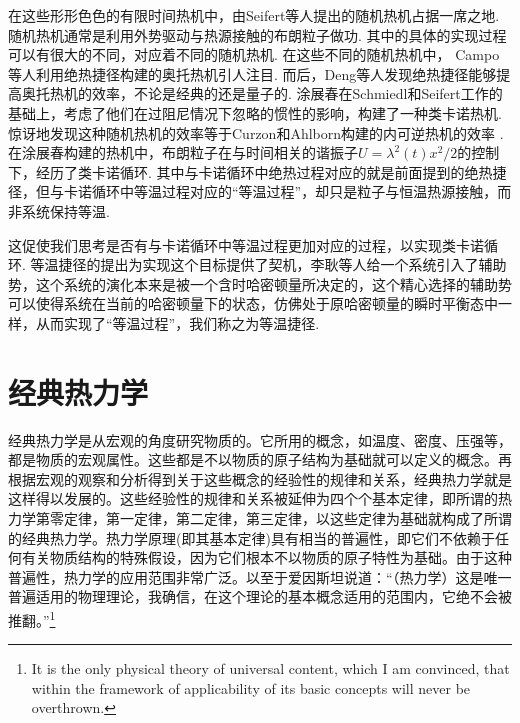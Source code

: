 在这些形形色色的有限时间热机中，由Seifert等人提出的随机热机\cite{Schmiedl2008}占据一席之地. 随机热机通常是利用外势驱动与热源接触的布朗粒子做功. 其中的具体的实现过程可以有很大的不同，对应着不同的随机热机. 在这些不同的随机热机中， Campo等人利用绝热捷径构建的奥托热机\cite{DelCampo2014}引人注目. 而后，Deng等人发现绝热捷径能够提高奥托热机的效率，不论是经典的还是量子的.\cite{Deng2013} 涂展春在Schmiedl和Seifert工作\cite{Schmiedl2008}的基础上，考虑了他们在过阻尼情况下忽略的惯性的影响，构建了一种类卡诺热机\cite{Tu2013}. 惊讶地发现这种随机热机的效率等于Curzon和Ahlborn构建的内可逆热机\cite{Curzon1975}的效率 . 在涂展春构建的热机中\cite{Tu2013}，布朗粒子在与时间相关的谐振子$U=\lambda ^2\left( t \right) x^2/2$的控制下，经历了类卡诺循环. 其中与卡诺循环中绝热过程对应的就是前面提到的绝热捷径，但与卡诺循环中等温过程对应的“等温过程”，却只是粒子与恒温热源接触，而非系统保持等温. 

这促使我们思考是否有与卡诺循环中等温过程更加对应的过程，以实现类卡诺循环. 等温捷径\cite{Li2016}的提出为实现这个目标提供了契机，李耿等人给一个系统引入了辅助势，这个系统的演化本来是被一个含时哈密顿量所决定的，这个精心选择的辅助势可以使得系统在当前的哈密顿量下的状态，仿佛处于原哈密顿量的瞬时平衡态中一样，从而实现了“等温过程”，我们称之为等温捷径.



\section{经典热力学}

\qquad 经典热力学是从宏观的角度研究物质的。它所用的概念，如温度、密度、压强等，都是物质的宏观属性。这些都是不以物质的原子结构为基础就可以定义的概念。再根据宏观的观察和分析得到关于这些概念的经验性的规律和关系，经典热力学就是这样得以发展的。这些经验性的规律和关系被延伸为四个个基本定律，即所谓的热力学第零定律，第一定律，第二定律，第三定律，以这些定律为基础就构成了所谓的经典热力学。热力学原理(即其基本定律)具有相当的普遍性，即它们不依赖于任何有关物质结构的特殊假设，因为它们根本不以物质的原子特性为基础。由于这种普遍性，热力学的应用范围非常广泛。以至于爱因斯坦说道\cite{schilpp1979albert}：“（热力学）这是唯一普遍适用的物理理论，我确信，在这个理论的基本概念适用的范围内，它绝不会被推翻。”\footnote{It is the only physical theory of universal content, which I am convinced, that within the framework of applicability of its basic concepts will never be
overthrown.}

